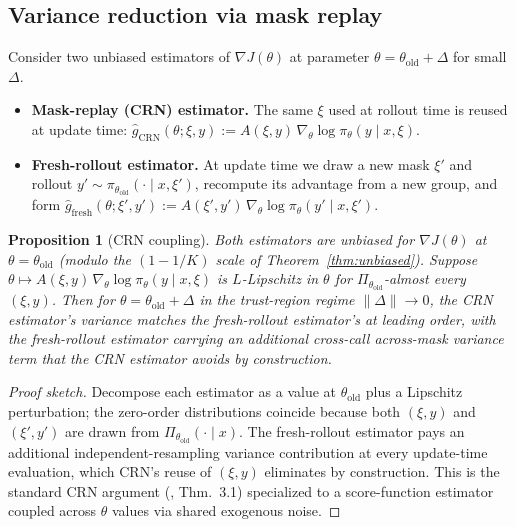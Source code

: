 \documentclass[11pt]{article}
\newtheorem{proposition}[theorem]{Proposition}
\theoremstyle{definition}
\theoremstyle{remark}
\newcommand{\old}{\mathrm{old}}
\begin{document}
\subsection{Variance reduction via mask replay}
\label{sec:theory-crn}

Consider two unbiased estimators of $\nabla J(\theta)$ at parameter
$\theta = \theta_\old + \Delta$ for small $\Delta$.

\begin{itemize}[topsep=2pt,itemsep=2pt]
\item \textbf{Mask-replay (CRN) estimator.}  The same $\xi$ used at
      rollout time is reused at update time:
      $\hat g_{\mathrm{CRN}}(\theta;\xi,y)
        := A(\xi,y)\,\nabla_\theta \log \pi_\theta(y \mid x, \xi)$.
\item \textbf{Fresh-rollout estimator.}  At update time we draw a new
      mask $\xi'$ and rollout
      $y' \sim \pi_{\theta_\old}(\cdot \mid x, \xi')$, recompute its
      advantage from a new group, and form
      $\hat g_{\mathrm{fresh}}(\theta;\xi',y')
        := A(\xi',y')\,\nabla_\theta \log \pi_\theta(y' \mid x, \xi')$.
\end{itemize}

\begin{proposition}[CRN coupling]
\label{prop:crn}
Both estimators are unbiased for $\nabla J(\theta)$ at
$\theta = \theta_\old$ (modulo the $(1 - 1/K)$ scale of
Theorem~\ref{thm:unbiased}).  Suppose
$\theta \mapsto A(\xi, y)\,\nabla_\theta \log \pi_\theta(y \mid x, \xi)$
is $L$-Lipschitz in $\theta$ for $\Pi_{\theta_\old}$-almost every
$(\xi, y)$.  Then for $\theta = \theta_\old + \Delta$ in the
trust-region regime $\|\Delta\| \to 0$, the CRN estimator's variance
matches the fresh-rollout estimator's at leading order, with the
fresh-rollout estimator carrying an additional cross-call
across-mask variance term that the CRN estimator avoids by
construction.
\end{proposition}

\begin{proof}[Proof sketch]
Decompose each estimator as a value at $\theta_\old$ plus a Lipschitz
perturbation; the zero-order distributions coincide because both
$(\xi, y)$ and $(\xi', y')$ are drawn from
$\Pi_{\theta_\old}(\cdot \mid x)$.  The fresh-rollout estimator pays
an additional independent-resampling variance contribution at every
update-time evaluation, which CRN's reuse of $(\xi, y)$ eliminates by
construction.  This is the standard CRN argument
(\citealp{glasserman1992crn}, Thm.\ 3.1) specialized to a
score-function estimator coupled across $\theta$ values via shared
exogenous noise.
\end{proof}
\end{document}
